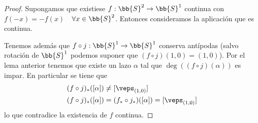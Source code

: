 \begin{lema}
\begin{proof}
        Supongamos que existiese $f:\bb{S}^2 \to \bb{S}^1$ continua con $f(-x) = -f(x)$\ \ $\forall x \in \bb{S}^2$. Entonces consideramos la aplicación 
        que es continua.
        
        \begin{figure}[H]
            \centering
        \end{figure}
        
        Tenemos además que $f\circ j : \bb{S}^1 \to \bb{S}^1$ conserva antípodas (salvo rotación de $\bb{S}^1$ podemos suponer que $(f\circ j)(1,0)=(1,0)$). Por el lema anterior tenemos que existe un lazo $\alpha$ tal que $\deg((f\circ j)(\alpha))$ es impar. En particular se tiene que 
        \begin{align*}
            (f\circ j)_*([\alpha]) &\neq [\veps_{(1,0)}]\\
            (f\circ j)_*([\alpha]) &= (f_* \circ j_*)([\alpha]) = [\veps_{(1,0)}]
        \end{align*}
        lo que contradice la existencia de $f$ continua.
    \end{proof}
\end{lema}

